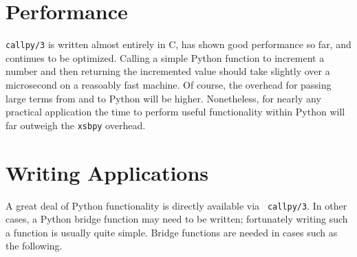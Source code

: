 \section{Performance}

{\tt callpy/3} is written almost entirely in C, has shown good
performance so far, and continues to be optimized.  Calling a simple
Python function to increment a number and then returning the
incremented value should take slightly over a microsecond on a
reasoably fast machine.  Of course, the overhead for passing large
terms from and to Python will be higher.  Nonetheless, for nearly any
practical application the time to perform useful functionality within
Python will far outweigh the {\tt xsbpy} overhead.

\section{Writing Applications}

A great deal of Python functionality is directly available via {\tt
  callpy/3}.  In other cases, a Python bridge function may need to be
written; fortunately writing such a function is usually quite
simple.  Bridge functions are needed in cases such as the following.

